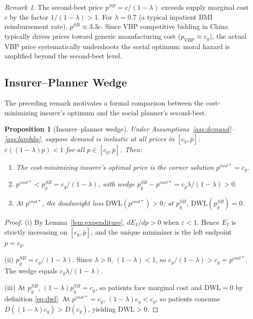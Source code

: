 \documentclass[12pt]{article}
\theoremstyle{plain}
\newtheorem{proposition}{Proposition}
\theoremstyle{definition}
\theoremstyle{remark}
\newtheorem{remark}{Remark}
\newcommand{\pbar}{\bar{p}}
\newcommand{\EI}{E_{I}}
\newcommand{\Pcost}{p^{cost*}}
\newcommand{\1}{\mathbf{1}}
\begin{document}
\begin{remark}
The second-best price $p^{SB} = c/(1-\lambda)$ exceeds supply marginal cost $c$ by the factor $1/(1-\lambda) > 1$. For $\lambda = 0.7$ (a typical inpatient BMI reimbursement rate), $p^{SB} \approx 3.3c$. Since VBP competitive bidding in China typically drives prices toward generic manufacturing cost ($p_{\mathrm{VBP}} \approx c_g$), the actual VBP price systematically undershoots the social optimum: moral hazard is amplified beyond the second-best level.
\end{remark}

\subsection{Insurer--Planner Wedge}

The preceding remark motivates a formal comparison between the cost-minimizing insurer's optimum and the social planner's second-best.

\begin{proposition}[Insurer--planner wedge]
\label{prop:wedge}
Under Assumptions~\ref{ass:demand}--\ref{ass:lambda}, suppose demand is inelastic at all prices in $[c_g, \pbar]$: $\varepsilon((1-\lambda)p) < 1$ for all $p \in [c_g, \pbar]$. Then:
\begin{enumerate}
\item[(i)] The cost-minimizing insurer's optimal price is the corner solution $\Pcost = c_g$.
\item[(ii)] $\Pcost < p^{SB}_g = c_g/(1-\lambda)$, with wedge $p^{SB}_g - \Pcost = c_g\lambda/(1-\lambda) > 0$.
\item[(iii)] At $\Pcost$, the deadweight loss $\mathrm{DWL}(\Pcost) > 0$; at $p^{SB}_g$, $\mathrm{DWL}(p^{SB}_g) = 0$.
\end{enumerate}
\end{proposition}

\begin{proof}
(i) By Lemma~\ref{lem:expenditure}, $d\EI/dp > 0$ when $\varepsilon < 1$. Hence $\EI$ is strictly increasing on $[c_g, \pbar]$, and the unique minimizer is the left endpoint $p = c_g$.

(ii) $p^{SB}_g = c_g/(1-\lambda)$. Since $\lambda > 0$, $(1-\lambda) < 1$, so $c_g/(1-\lambda) > c_g = \Pcost$. The wedge equals $c_g\lambda/(1-\lambda)$.

(iii) At $p^{SB}_g$, $(1-\lambda)p^{SB}_g = c_g$, so patients face marginal cost and $\mathrm{DWL} = 0$ by definition \eqref{eq:dwl}. At $\Pcost = c_g$, $(1-\lambda)c_g < c_g$, so patients consume $D((1-\lambda)c_g) > D(c_g)$, yielding $\mathrm{DWL} > 0$.
\end{proof}
\end{document}
